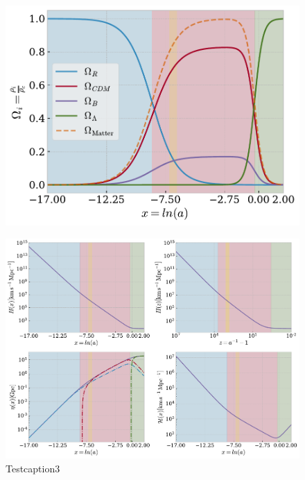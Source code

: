 \documentclass[10pt,a4paper]{article}
\begin{document}
\begin{figure}[ht]
    \centering
    \includegraphics[scale=0.5]{../figs/omegas_of_x.pdf}
    \caption{}
    \label{fig:omegas_of_x}
\end{figure}

\begin{figure}[ht]
    \centering
    \includegraphics[scale=0.5]{../figs/Hubble_eta_of_x.pdf}
    \caption{Testcaption3}
    \label{fig:hubbe_and_eta}
\end{figure}
\end{document}
